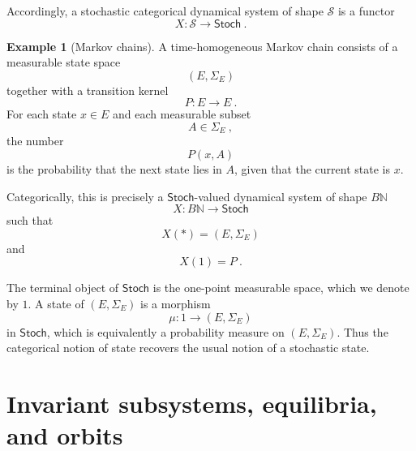 \documentclass[a4paper,reqno,oneside]{amsart}
\theoremstyle{definition}
\newtheorem{example}[theorem]{Example}
\theoremstyle{remark}
\newcommand{\N}{\mathbb{N}}
\renewcommand{\Sigma}{\varSigma}
\numberwithin{equation}{section}
\begin{document}
	
	Accordingly, a stochastic categorical dynamical system of shape
	$\mathcal S$ is a functor
	\begin{equation}
		X\colon \mathcal S\longrightarrow \mathsf{Stoch} \ .
	\end{equation}
	
	\begin{example}[Markov chains]
		A time-homogeneous Markov chain consists of a measurable state space
		\begin{equation}
			(E,\Sigma_E)
		\end{equation}
		together with a transition kernel
		\begin{equation}
			P\colon E\longrightarrow E \ .
		\end{equation}
		For each state $x\in E$ and each measurable subset
		\begin{equation}
			A\in\Sigma_E \ ,
		\end{equation}
		the number
		\begin{equation}
			P(x,A)
		\end{equation}
		is the probability that the next state lies in $A$, given that the current
		state is $x$.
		
		Categorically, this is precisely a $\mathsf{Stoch}$-valued dynamical system of shape $B\N$
		\begin{equation}
			X\colon B\N\longrightarrow \mathsf{Stoch}
		\end{equation}
		such that
		\begin{equation}
			X(*)= (E, \Sigma_E)
		\end{equation}
		and
		\begin{equation}
			X(1)=P \ .
		\end{equation}
		
		The terminal object of $\mathsf{Stoch}$ is the one-point measurable space, which we denote by $1$. A state of $(E,\Sigma_E)$ is a morphism
		\begin{equation}
			\mu\colon 1\longrightarrow (E,\Sigma_E)
		\end{equation}
		in $\mathsf{Stoch}$, which is equivalently a probability measure on $(E,\Sigma_E)$. Thus the categorical notion of state recovers the usual notion of a stochastic state.
	\end{example}
	
	
	
	
	
	
	
	
	\section{Invariant subsystems, equilibria, and orbits}
	
\end{document}
